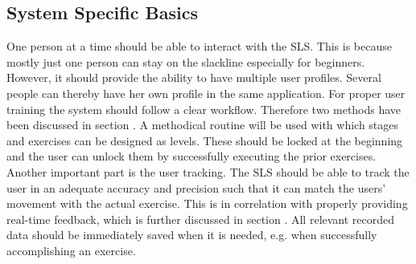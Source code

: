 \subsection{System Specific Basics}\label{systemBasics}
One person at a time should be able to interact with the SLS. This is because mostly just one person can stay on the slackline especially for beginners. However, it should provide the ability to have multiple user profiles. Several people can thereby have her own profile in the same application. For proper user training the system should follow a clear workflow. Therefore two methods have been discussed in section \textit{}. A methodical routine will be used with which stages and exercises can be designed as levels. These should be locked at the beginning and the user can unlock them by successfully executing the prior exercises. Another important part is the user tracking. The SLS should be able to track the user in an adequate accuracy and precision such that it can match the users' movement with the actual exercise. %
This is in correlation with properly providing real-time feedback, which is further discussed in section \textit{}. All relevant recorded data should be immediately saved when it is needed, e.g. when successfully accomplishing an exercise.

\begin{comment}
- System should be able to track user appropriately
- All relevant data should be immediately saved when it is needed (unlocking exercise/stage, failing/accomplish exercise)
- Information about where the user currently is should be given --> title
- User selection
- Also a possibility to go to the last screen if she misclicks should be given.
\end{comment}